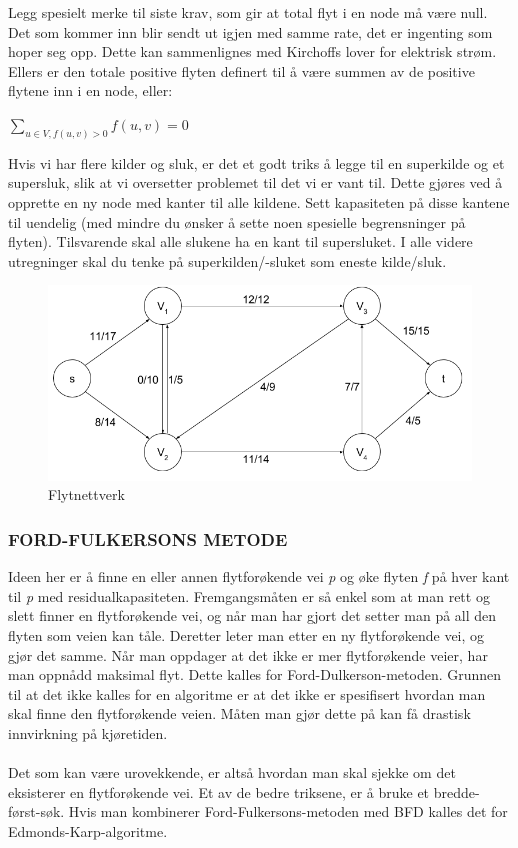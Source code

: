 \noindent Legg spesielt merke til siste krav, som gir at total flyt i en node må være null. Det som kommer inn blir sendt ut igjen med samme rate, det er ingenting som hoper seg opp. Dette kan sammenlignes med Kirchoffs lover for elektrisk strøm. Ellers er den totale positive flyten definert til å være summen av de positive flytene inn i en node, eller:
\begin{center}
    $\sum\limits_{u \in V, f(u,v)>0} f(u,v) = 0$ 
    \end{center}
    
\noindent Hvis vi har flere kilder og sluk, er det et godt triks å legge til en superkilde og et supersluk, slik at vi oversetter problemet til det vi er vant til. Dette gjøres ved å opprette en ny node med kanter til alle kildene. Sett kapasiteten på disse kantene til uendelig (med mindre du ønsker å sette noen spesielle begrensninger på flyten). Tilsvarende skal alle slukene ha en kant til supersluket. I alle videre utregninger skal du tenke på superkilden/-sluket som eneste kilde/sluk.

\begin{figure}[H]
\includegraphics[scale=0.6]{images/flytnettverk}
\centering %
\caption{Flytnettverk}
\label{fig:flytnettverk}
\end{figure}

\subsubsection{FORD-FULKERSONS METODE}
Ideen her er å finne en eller annen flytforøkende vei \textit{p} og øke flyten \textit{f} på hver kant til \textit{p} med residualkapasiteten. Fremgangsmåten er så enkel som at man rett og slett finner en flytforøkende vei, og når man har gjort det setter man på all den flyten som veien kan tåle. Deretter leter man etter en ny flytforøkende vei, og gjør det samme. Når man oppdager at det ikke er mer flytforøkende veier, har man oppnådd maksimal flyt. Dette kalles for Ford-Dulkerson-metoden. Grunnen til at det ikke kalles for en algoritme er at det ikke er spesifisert hvordan man skal finne den flytforøkende veien. Måten man gjør dette på kan få drastisk innvirkning på kjøretiden.
\\\\
Det som kan være urovekkende, er altså hvordan man skal sjekke om det eksisterer en flytforøkende vei. Et av de bedre triksene, er å bruke et bredde-først-søk. Hvis man kombinerer Ford-Fulkersons-metoden med BFD kalles det for Edmonds-Karp-algoritme.

